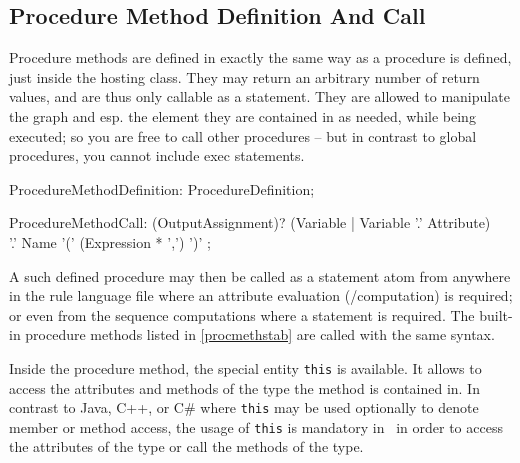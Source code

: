 \subsection{Procedure Method Definition And Call}\label{sub:proceduremethods}\label{sec:procmethcall} 

Procedure methods are defined in exactly the same way as a procedure is defined, just inside the hosting class.
They may return an arbitrary number of return values, and are thus only callable as a statement.
They are allowed to manipulate the graph and esp. the element they are contained in as needed, while being executed;
so you are free to call other procedures -- but in contrast to global procedures, you cannot include exec statements.

\begin{rail} 
  ProcedureMethodDefinition: ProcedureDefinition;
\end{rail}

\begin{rail}
  ProcedureMethodCall: (OutputAssignment)? (Variable | Variable '.' Attribute) \\
		'.' Name '(' (Expression * ',') ')' ;
\end{rail}

A such defined procedure may then be called as a statement atom from anywhere in the rule language file where an attribute evaluation (/computation) is required; or even from the sequence computations where a statement is required.
The built-in procedure methods listed in \ref{procmethstab} are called with the same syntax.

Inside the procedure method, the special entity \texttt{this} is available.
It allows to access the attributes and methods of the type the method is contained in.
In contrast to Java, C++, or C\# where \texttt{this} may be used optionally to denote member or method access,
the usage of \texttt{this} is mandatory in \GrG~in order to access the attributes of the type or call the methods of the type.


